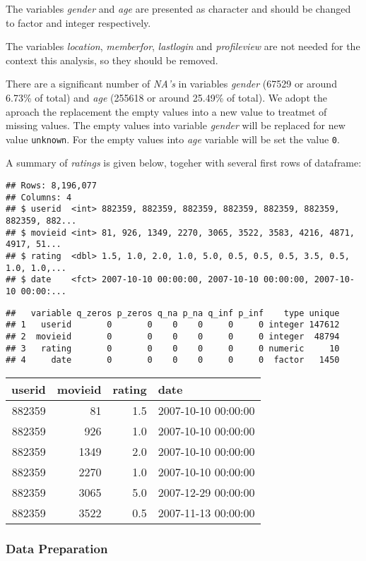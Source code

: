 \documentclass[
  12pt,
]{report}
\begin{document}
The variables \emph{gender} and \emph{age} are presented as character
and should be changed to factor and integer respectively.

The variables \emph{location}, \emph{memberfor}, \emph{lastlogin} and
\emph{profileview} are not needed for the context this analysis, so they
should be removed.

There are a significant number of \emph{NA's} in variables \emph{gender}
(67529 or around 6.73\% of total) and \emph{age} (255618 or around
25.49\% of total). We adopt the aproach the replacement the empty values
into a new value to treatmet of missing values. The empty values into
variable \emph{gender} will be replaced for new value \texttt{unknown}.
For the empty values into \emph{age} variable will be set the value
\texttt{0}.

A summary of \emph{ratings} is given below, togeher with several first
rows of dataframe:

\begin{verbatim}
## Rows: 8,196,077
## Columns: 4
## $ userid  <int> 882359, 882359, 882359, 882359, 882359, 882359, 882359, 882...
## $ movieid <int> 81, 926, 1349, 2270, 3065, 3522, 3583, 4216, 4871, 4917, 51...
## $ rating  <dbl> 1.5, 1.0, 2.0, 1.0, 5.0, 0.5, 0.5, 0.5, 3.5, 0.5, 1.0, 1.0,...
## $ date    <fct> 2007-10-10 00:00:00, 2007-10-10 00:00:00, 2007-10-10 00:00:...
\end{verbatim}

\begin{verbatim}
##   variable q_zeros p_zeros q_na p_na q_inf p_inf    type unique
## 1   userid       0       0    0    0     0     0 integer 147612
## 2  movieid       0       0    0    0     0     0 integer  48794
## 3   rating       0       0    0    0     0     0 numeric     10
## 4     date       0       0    0    0     0     0  factor   1450
\end{verbatim}

\begin{longtable}[]{@{}rrrl@{}}
\toprule
userid & movieid & rating & date\tabularnewline
\midrule
\endhead
882359 & 81 & 1.5 & 2007-10-10 00:00:00\tabularnewline
882359 & 926 & 1.0 & 2007-10-10 00:00:00\tabularnewline
882359 & 1349 & 2.0 & 2007-10-10 00:00:00\tabularnewline
882359 & 2270 & 1.0 & 2007-10-10 00:00:00\tabularnewline
882359 & 3065 & 5.0 & 2007-12-29 00:00:00\tabularnewline
882359 & 3522 & 0.5 & 2007-11-13 00:00:00\tabularnewline
\bottomrule
\end{longtable}

\hypertarget{data-preparation}{%
\subsubsection{Data Preparation}\label{data-preparation}}
\end{document}
